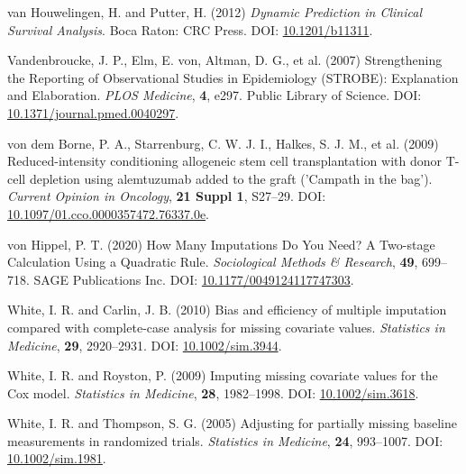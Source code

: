 \documentclass[
  letterpaper,
  DIV=11,
  numbers=noendperiod]{scrreprt}
\newlength{\cslhangindent}
\newlength{\cslentryspacingunit} %
\newenvironment{CSLReferences}[2] %
 {%
  \setlength{\parindent}{0pt}
  \ifodd #1
  \let\oldpar\par
  \def\par{\hangindent=\cslhangindent\oldpar}
  \fi
  \setlength{\parskip}{#2\cslentryspacingunit}
 }%
 {}
\begin{document}
\begin{CSLReferences}{1}{0}
\leavevmode{}%
van Houwelingen, H. and Putter, H. (2012) \emph{Dynamic {Prediction} in
{Clinical Survival Analysis}}. Boca Raton: CRC Press. DOI:
\href{https://doi.org/10.1201/b11311}{10.1201/b11311}.

\leavevmode{}%
Vandenbroucke, J. P., Elm, E. von, Altman, D. G., et al. (2007)
Strengthening the {Reporting} of {Observational Studies} in
{Epidemiology} ({STROBE}): {Explanation} and {Elaboration}. \emph{PLOS
Medicine}, \textbf{4}, e297. Public Library of Science. DOI:
\href{https://doi.org/10.1371/journal.pmed.0040297}{10.1371/journal.pmed.0040297}.

\leavevmode{}%
von dem Borne, P. A., Starrenburg, C. W. J. I., Halkes, S. J. M., et al.
(2009) Reduced-intensity conditioning allogeneic stem cell
transplantation with donor {T-cell} depletion using alemtuzumab added to
the graft ('{Campath} in the bag'). \emph{Current Opinion in Oncology},
\textbf{21 Suppl 1}, S27--29. DOI:
\href{https://doi.org/10.1097/01.cco.0000357472.76337.0e}{10.1097/01.cco.0000357472.76337.0e}.

\leavevmode{}%
von Hippel, P. T. (2020) How {Many Imputations Do You Need}? {A
Two-stage Calculation Using} a {Quadratic Rule}. \emph{Sociological
Methods \& Research}, \textbf{49}, 699--718. SAGE Publications Inc. DOI:
\href{https://doi.org/10.1177/0049124117747303}{10.1177/0049124117747303}.

\leavevmode{}%
White, I. R. and Carlin, J. B. (2010) Bias and efficiency of multiple
imputation compared with complete-case analysis for missing covariate
values. \emph{Statistics in Medicine}, \textbf{29}, 2920--2931. DOI:
\href{https://doi.org/10.1002/sim.3944}{10.1002/sim.3944}.

\leavevmode{}%
White, I. R. and Royston, P. (2009) Imputing missing covariate values
for the {Cox} model. \emph{Statistics in Medicine}, \textbf{28},
1982--1998. DOI:
\href{https://doi.org/10.1002/sim.3618}{10.1002/sim.3618}.

\leavevmode{}%
White, I. R. and Thompson, S. G. (2005) Adjusting for partially missing
baseline measurements in randomized trials. \emph{Statistics in
Medicine}, \textbf{24}, 993--1007. DOI:
\href{https://doi.org/10.1002/sim.1981}{10.1002/sim.1981}.


\end{CSLReferences}
\end{document}
